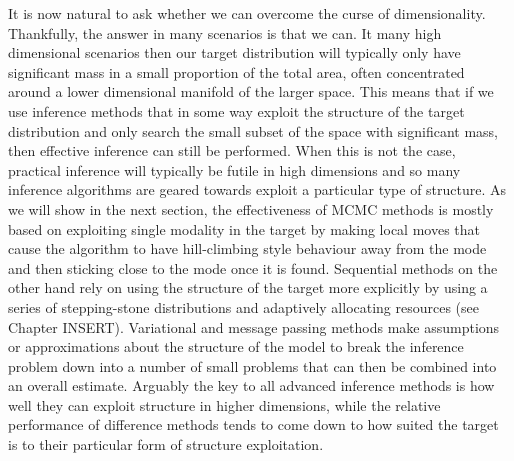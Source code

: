 It is now natural to ask whether we can overcome the curse of dimensionality.  Thankfully, the
answer in many scenarios is that we can.  It many high dimensional scenarios then our target
distribution will typically only have significant mass in a small proportion of the total area, often
concentrated around a lower dimensional manifold of the larger space.  This means that if
we use inference methods that in some way exploit the structure of the target distribution and only
search the small subset of the space with significant mass, then effective inference can still be
performed.  When this is not the case, practical inference will typically be futile in high dimensions
and so many inference algorithms are geared towards exploit a particular type of structure.
As we will show in the next section, the effectiveness of MCMC methods is mostly based on 
exploiting single modality in the target by making local moves that cause the algorithm to have
hill-climbing style behaviour away from the mode and then sticking close to the mode once it
is found.  Sequential \mc methods on the other hand rely on using the structure of the target
more explicitly by using a series of stepping-stone distributions and adaptively allocating
resources (see Chapter INSERT).  Variational and message passing methods make assumptions
or approximations about the structure of the model to break the inference problem down
into a number of small problems that can then be combined into an overall estimate.
Arguably the key to all advanced inference methods is how well they can exploit structure
in higher dimensions, while the relative performance of difference methods tends to come down
to how suited the target is to their particular form of structure exploitation.